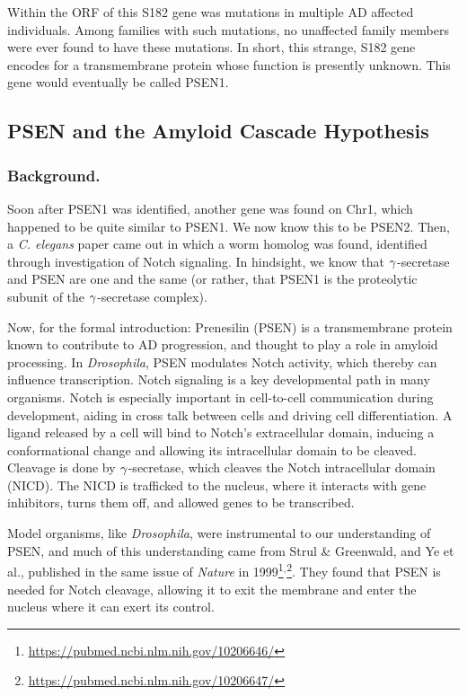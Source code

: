 Within the ORF of this S182 gene was mutations in multiple AD affected individuals. Among families with such mutations, no unaffected family members were ever found to have these mutations. In short, this strange, S182 gene encodes for a transmembrane protein whose function is presently unknown. This gene would eventually be called PSEN1. 

\subsection*{PSEN and the Amyloid Cascade Hypothesis}


\subsubsection*{Background.}

Soon after PSEN1 was identified, another gene was found on Chr1, which happened to be quite similar to PSEN1. We now know this to be PSEN2. Then, a \textit{C. elegans} paper came out in which a worm homolog was found, identified through investigation of Notch signaling. In hindsight, we know that $\gamma$-secretase and PSEN are one and the same (or rather, that PSEN1 is the proteolytic subunit of the $\gamma$-secretase complex).\newline

Now, for the formal introduction: Prenesilin (PSEN) is a transmembrane protein known to contribute to AD progression, and thought to play a role in amyloid processing. In \textit{Drosophila}, PSEN modulates Notch activity, which thereby can influence transcription. Notch signaling is a key developmental path in many organisms. Notch is especially important in cell-to-cell communication during development, aiding in cross talk between cells and driving cell differentiation. A ligand released by a cell will bind to Notch's extracellular domain, inducing a conformational change and allowing its intracellular domain to be cleaved. Cleavage is done by $\gamma$-secretase, which cleaves the Notch intracellular domain (NICD). The NICD is trafficked to the nucleus, where it interacts with gene inhibitors, turns them off, and allowed genes to be transcribed.\newline

Model organisms, like \textit{Drosophila}, were instrumental to our understanding of PSEN, and much of this understanding came from Strul \& Greenwald, and Ye et al., published in the same issue of \textit{Nature} in 1999\footnote{\url{https://pubmed.ncbi.nlm.nih.gov/10206646/}}$^,$\footnote{\url{https://pubmed.ncbi.nlm.nih.gov/10206647/}}. They found that PSEN is needed for Notch cleavage, allowing it to exit the membrane and enter the nucleus where it can exert its control.

